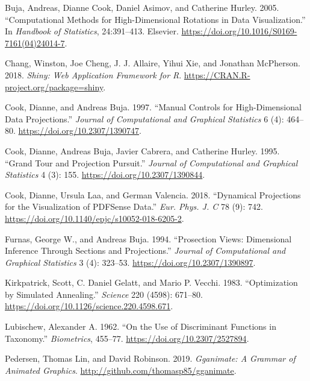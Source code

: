 \leavevmode\hypertarget{ref-buja_computational_2005}{}%
Buja, Andreas, Dianne Cook, Daniel Asimov, and Catherine Hurley. 2005.
``Computational Methods for High-Dimensional Rotations in Data
Visualization.'' In \emph{Handbook of Statistics}, 24:391--413.
Elsevier. \url{https://doi.org/10.1016/S0169-7161(04)24014-7}.

\leavevmode\hypertarget{ref-chang_shiny:_2018}{}%
Chang, Winston, Joe Cheng, J. J. Allaire, Yihui Xie, and Jonathan
McPherson. 2018. \emph{Shiny: Web Application Framework for R}.
\url{https://CRAN.R-project.org/package=shiny}.

\leavevmode\hypertarget{ref-cook_manual_1997}{}%
Cook, Dianne, and Andreas Buja. 1997. ``Manual Controls for
High-Dimensional Data Projections.'' \emph{Journal of Computational and
Graphical Statistics} 6 (4): 464--80.
\url{https://doi.org/10.2307/1390747}.

\leavevmode\hypertarget{ref-cook_grand_1995}{}%
Cook, Dianne, Andreas Buja, Javier Cabrera, and Catherine Hurley. 1995.
``Grand Tour and Projection Pursuit.'' \emph{Journal of Computational
and Graphical Statistics} 4 (3): 155.
\url{https://doi.org/10.2307/1390844}.

\leavevmode\hypertarget{ref-cook_dynamical_2018}{}%
Cook, Dianne, Ursula Laa, and German Valencia. 2018. ``Dynamical
Projections for the Visualization of PDFSense Data.'' \emph{Eur. Phys.
J. C} 78 (9): 742. \url{https://doi.org/10.1140/epjc/s10052-018-6205-2}.

\leavevmode\hypertarget{ref-furnas_prosection_1994}{}%
Furnas, George W., and Andreas Buja. 1994. ``Prosection Views:
Dimensional Inference Through Sections and Projections.'' \emph{Journal
of Computational and Graphical Statistics} 3 (4): 323--53.
\url{https://doi.org/10.2307/1390897}.

\leavevmode\hypertarget{ref-kirkpatrick_optimization_1983}{}%
Kirkpatrick, Scott, C. Daniel Gelatt, and Mario P. Vecchi. 1983.
``Optimization by Simulated Annealing.'' \emph{Science} 220 (4598):
671--80. \url{https://doi.org/10.1126/science.220.4598.671}.

\leavevmode\hypertarget{ref-lubischew_use_1962}{}%
Lubischew, Alexander A. 1962. ``On the Use of Discriminant Functions in
Taxonomy.'' \emph{Biometrics}, 455--77.
\url{https://doi.org/10.2307/2527894}.

\leavevmode\hypertarget{ref-pedersen_gganimate:_2019}{}%
Pedersen, Thomas Lin, and David Robinson. 2019. \emph{Gganimate: A
Grammar of Animated Graphics}.
\url{http://github.com/thomasp85/gganimate}.

